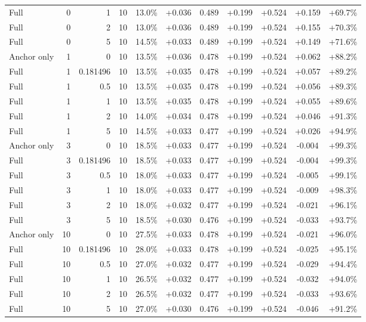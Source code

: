 \begin{table}[htbp]
\begin{tabular}{lrrrccccccc}
Full & 0 & 1 & 10 & 13.0\% & +0.036 & 0.489 & +0.199 & +0.524 & +0.159 & +69.7\% \\
Full & 0 & 2 & 10 & 13.0\% & +0.036 & 0.489 & +0.199 & +0.524 & +0.155 & +70.3\% \\
Full & 0 & 5 & 10 & 14.5\% & +0.033 & 0.489 & +0.199 & +0.524 & +0.149 & +71.6\% \\
Anchor only & 1 & 0 & 10 & 13.5\% & +0.036 & 0.478 & +0.199 & +0.524 & +0.062 & +88.2\% \\
Full & 1 & 0.181496 & 10 & 13.5\% & +0.035 & 0.478 & +0.199 & +0.524 & +0.057 & +89.2\% \\
Full & 1 & 0.5 & 10 & 13.5\% & +0.035 & 0.478 & +0.199 & +0.524 & +0.056 & +89.3\% \\
Full & 1 & 1 & 10 & 13.5\% & +0.035 & 0.478 & +0.199 & +0.524 & +0.055 & +89.6\% \\
Full & 1 & 2 & 10 & 14.0\% & +0.034 & 0.478 & +0.199 & +0.524 & +0.046 & +91.3\% \\
Full & 1 & 5 & 10 & 14.5\% & +0.033 & 0.477 & +0.199 & +0.524 & +0.026 & +94.9\% \\
Anchor only & 3 & 0 & 10 & 18.5\% & +0.033 & 0.477 & +0.199 & +0.524 & -0.004 & +99.3\% \\
Full & 3 & 0.181496 & 10 & 18.5\% & +0.033 & 0.477 & +0.199 & +0.524 & -0.004 & +99.3\% \\
Full & 3 & 0.5 & 10 & 18.0\% & +0.033 & 0.477 & +0.199 & +0.524 & -0.005 & +99.1\% \\
Full & 3 & 1 & 10 & 18.0\% & +0.033 & 0.477 & +0.199 & +0.524 & -0.009 & +98.3\% \\
Full & 3 & 2 & 10 & 18.0\% & +0.032 & 0.477 & +0.199 & +0.524 & -0.021 & +96.1\% \\
Full & 3 & 5 & 10 & 18.5\% & +0.030 & 0.476 & +0.199 & +0.524 & -0.033 & +93.7\% \\
Anchor only & 10 & 0 & 10 & 27.5\% & +0.033 & 0.478 & +0.199 & +0.524 & -0.021 & +96.0\% \\
Full & 10 & 0.181496 & 10 & 28.0\% & +0.033 & 0.478 & +0.199 & +0.524 & -0.025 & +95.1\% \\
Full & 10 & 0.5 & 10 & 27.0\% & +0.032 & 0.477 & +0.199 & +0.524 & -0.029 & +94.4\% \\
Full & 10 & 1 & 10 & 26.5\% & +0.032 & 0.477 & +0.199 & +0.524 & -0.032 & +94.0\% \\
Full & 10 & 2 & 10 & 26.5\% & +0.032 & 0.477 & +0.199 & +0.524 & -0.033 & +93.6\% \\
Full & 10 & 5 & 10 & 27.0\% & +0.030 & 0.476 & +0.199 & +0.524 & -0.046 & +91.2\% \\

\end{tabular}
\end{table}
